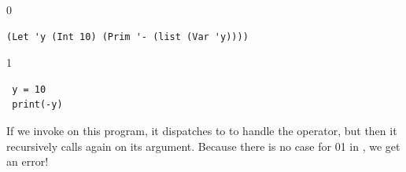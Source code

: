 \documentclass[7x10]{TimesAPriori_MIT}%
\def\racketEd{0}
\def\pythonEd{1}
\def\edition{1}
\newcommand{\racket}[1]{{\if\edition\racketEd{#1}\fi}}
\newcommand{\pythonColor}[0]{}
\newcommand{\python}[1]{{\if\edition\pythonEd\pythonColor #1\fi}}
\numberwithin{theorem}{chapter}
\numberwithin{definition}{chapter}
\numberwithin{equation}{chapter}
\begin{document}
{\if\edition\racketEd
\begin{lstlisting}
(Let 'y (Int 10) (Prim '- (list (Var 'y))))
\end{lstlisting}
\fi}
{\if\edition\pythonEd\pythonColor
\begin{minipage}{1.0\textwidth}
\begin{lstlisting}
 y = 10 
 print(-y)
\end{lstlisting}
\end{minipage}
\fi}

\noindent If we invoke  on this program, it
dispatches to  to handle the \code{-} operator, but
then it recursively calls  again on its argument.
Because there is no case for \racket{}\python{} in
, we get an error!
\end{document}
